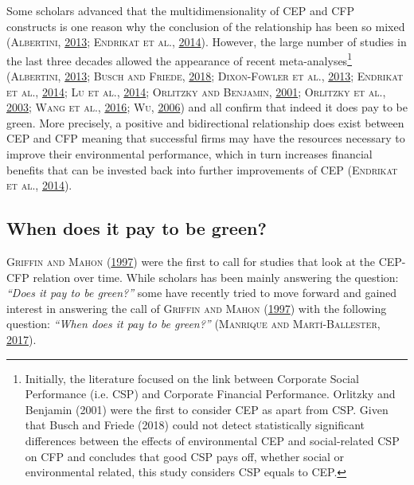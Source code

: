 \documentclass[12pt,]{article}
\let\rmarkdownfootnote\footnote%
\def\footnote{\protect\rmarkdownfootnote}
\begin{document}
Some scholars advanced that the multidimensionality of CEP and CFP
constructs is one reason why the conclusion of the relationship has been
so mixed (\textsc{Albertini},
\protect\hyperlink{ref-Albertini2013}{2013}; \textsc{Endrikat et al.},
\protect\hyperlink{ref-EndrikatMakingsenseconflicting2014}{2014}).
However, the large number of studies in the last three decades allowed
the appearance of recent
meta-analyses\footnote{Initially, the literature focused on the link between Corporate Social Performance (i.e. CSP) and Corporate Financial Performance. Orlitzky and Benjamin (2001) were the first to consider CEP as apart from CSP. Given that Busch and Friede (2018) could not detect statistically significant differences between the effects of environmental CEP and social-related CSP on CFP and concludes that good CSP pays off, whether social or environmental related, this study considers CSP equals to CEP.}
(\textsc{Albertini}, \protect\hyperlink{ref-Albertini2013}{2013};
\textsc{Busch and Friede}, \protect\hyperlink{ref-Busch2018}{2018};
\textsc{Dixon-Fowler et al.},
\protect\hyperlink{ref-Dixon-Fowler2013}{2013}; \textsc{Endrikat et
al.}, \protect\hyperlink{ref-EndrikatMakingsenseconflicting2014}{2014};
\textsc{Lu et al.},
\protect\hyperlink{ref-Ludecadedebatenexus2014}{2014}; \textsc{Orlitzky
and Benjamin}, \protect\hyperlink{ref-Orlitzky2001}{2001};
\textsc{Orlitzky et al.}, \protect\hyperlink{ref-Orlitzky2003}{2003};
\textsc{Wang et al.},
\protect\hyperlink{ref-WangMetaAnalyticReviewCorporate2016}{2016};
\textsc{Wu}, \protect\hyperlink{ref-Wu2006}{2006}) and all confirm that
indeed it does pay to be green. More precisely, a positive and
bidirectional relationship does exist between CEP and CFP meaning that
successful firms may have the resources necessary to improve their
environmental performance, which in turn increases financial benefits
that can be invested back into further improvements of CEP
(\textsc{Endrikat et al.},
\protect\hyperlink{ref-EndrikatMakingsenseconflicting2014}{2014}).

\subsection{When does it pay to be
green?}\label{when-does-it-pay-to-be-green}

\textsc{Griffin and Mahon} (\protect\hyperlink{ref-Griffin1997}{1997})
were the first to call for studies that look at the CEP-CFP relation
over time. While scholars has been mainly answering the question:
\emph{``Does it pay to be green?''} some have recently tried to move
forward and gained interest in answering the call of \textsc{Griffin and
Mahon} (\protect\hyperlink{ref-Griffin1997}{1997}) with the following
question: \emph{``When does it pay to be green?''} (\textsc{Manrique and
Martí-Ballester},
\protect\hyperlink{ref-ManriqueAnalyzingEffectCorporate2017}{2017}).
\end{document}
